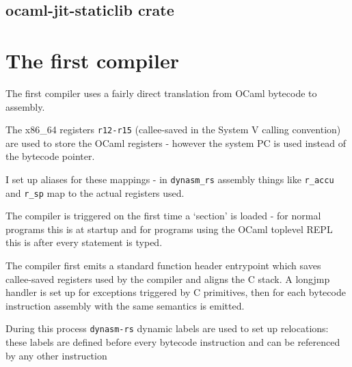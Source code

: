 \subsection{ocaml-jit-staticlib crate}


\section{The first compiler}

The first compiler uses a fairly direct translation from OCaml bytecode to assembly.

The x86\_64 registers \texttt{r12-r15} (callee-saved in the System V calling convention) are used
to store the OCaml registers - however the system PC is used instead of the bytecode pointer.

I set up aliases for these mappings - in \texttt{dynasm\_rs} assembly things like \texttt{r\_accu}
and
\texttt{r\_sp} map to the actual registers used.

The compiler is triggered on the first time a `section' is loaded - for normal programs this is at
startup and for programs using the OCaml toplevel REPL this is after every statement is typed.

The compiler first emits a standard function header entrypoint which saves callee-saved registers
used by the compiler and aligns the C stack. A longjmp handler is set up for exceptions triggered
by C primitives, then for each bytecode instruction assembly with the same semantics is emitted.

During this process \texttt{dynasm-rs} dynamic labels are used to set up relocations: these
labels are defined before every bytecode instruction and can be referenced by any other instruction


